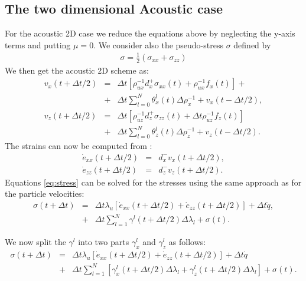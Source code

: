 \documentclass[11pt]{article}
\begin{document}
\subsection{The two dimensional Acoustic case}
For the acoustic 2D case we reduce the equations above by neglecting 
the y-axis terms
and putting $\mu=0$.
We consider also the pseudo-stress $\sigma$ defined by
\begin{eqnarray*}
\sigma = \frac{1}{2}\left(\sigma_{xx} + \sigma_{zz}\right) 
\end{eqnarray*}
We then get the acoustic 2D scheme as:
\begin{eqnarray*}
v_x(t+\Delta t/2) & = & \Delta t\left[\rho_{ux}^{-1}d^+_x \sigma_{xx}(t)  
                         + \rho_{ux}^{-1}f_x(t)\right] +\nonumber\\
           & + & \Delta t \sum_{l=0}^N\theta^l_{x}(t)\Delta\rho^{-1}_{x}  
                   +v_x(t-\Delta t/2),\nonumber\\
v_z(t+\Delta t/2) & = & \Delta t \left[\rho_{uz}^{-1}d^+_z \sigma_{zz}(t) 
                        + \Delta t \rho_{uz}^{-1}f_z(t)\right]\nonumber\\  
           & + & \Delta t\sum_{l=0}^N\theta^l_{z}(t)\Delta \rho^{-1}_{z}
                       +v_z(t-\Delta t/2). 
\end{eqnarray*}
The strains can now be computed from :
\begin{eqnarray*}
    \dot{e}_{xx}(t+\Delta t/2) & = & d^-_x v_x(t+\Delta t/2), \\
    \dot{e}_{zz}(t+\Delta t/2) & = & d^-_z v_z(t+\Delta t/2). 
\end{eqnarray*}
%
Equations \eqref{eq:stress}   can be solved for the stresses using 
the same approach as for the particle velocities:
\begin{eqnarray*}
  \sigma(t+\Delta t) 
       & = & \Delta t\lambda_u \left [\dot{e}_{xx}(t+\Delta t/2) 
             +\dot{e}_{zz}(t+\Delta t/2)\right]\nonumber
             +\Delta t\dot{q} \nonumber,                       \\
       & + & \Delta t\sum_{l=1}^N\gamma^l(t+\Delta t/2)\Delta\lambda_l  
                           + \sigma(t).
\end{eqnarray*} 

We now split the $\gamma^l$ into two parts $\gamma^l_x$ and $\gamma^l_z$ 
as follows:
\begin{eqnarray*}
  \sigma(t+\Delta t) & = & \Delta t\lambda_u \left [\dot{e}_{xx}(t+\Delta t/2) 
                          +\dot{e}_{zz}(t+\Delta t/2)\right]\nonumber
                           +\Delta t\dot{q} \nonumber\\
                     & + & \Delta t
                 \sum_{l=1}^N\left[\gamma^l_{x}(t+\Delta t/2)\Delta\lambda_l  
                                                   +\gamma^l_{z}(t+\Delta t/2)\Delta\lambda_l  \right]
                           + \sigma(t).\\
\end{eqnarray*} 
\end{document}
